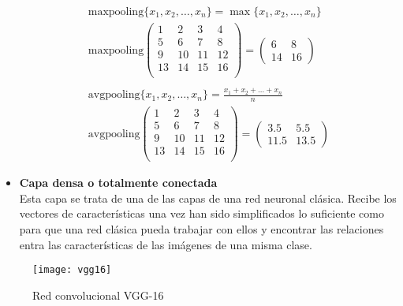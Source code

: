 \begin{itemize}
				$$
				\begin{gathered}
					\text{maxpooling}\{x_1, x_2, \hdots, x_n\} = \max\{x_1, x_2, \hdots, x_n\}\\
					\text{maxpooling}\left(\begin{array}{cc|cc}
						1 & 2 & 3 & 4\\
						5 & \boxed{6} & 7 & \boxed{8}\\\hline
						9 & 10 & 11 & 12\\
						13 & \boxed{14} & 15 & \boxed{16}\\
					\end{array}\right) = \begin{pmatrix}
						6 & 8\\
						14 & 16
					\end{pmatrix}\\\\
					\text{avgpooling}\{x_1, x_2, \hdots, x_n\} = \frac{x_1 + x_2 + \hdots + x_n}{n}\\
					\text{avgpooling}\left(\begin{array}{cc|cc}
						1 & 2 & 3 & 4\\
						5 & 6 & 7 & 8\\\hline
						9 & 10 & 11 & 12\\
						13 & 14 & 15 & 16\\
					\end{array}\right) = \begin{pmatrix}
						3.5 & 5.5\\
						11.5 & 13.5
					\end{pmatrix}
				\end{gathered}
				$$
				
				\item \textbf{Capa densa o totalmente conectada}\\
				Esta capa se trata de una de las capas de una red neuronal clásica. Recibe los vectores de características una vez han sido simplificados lo suficiente como para que una red clásica pueda trabajar con ellos y encontrar las relaciones entra las características de las imágenes de una misma clase. 
			\end{itemize}
			
			\begin{figure}[!h]
				\centering
				\texttt{[image: vgg16]}
				\caption{Red convolucional VGG-16}
				\label{fig:vgg16}
			\end{figure}
 		
		